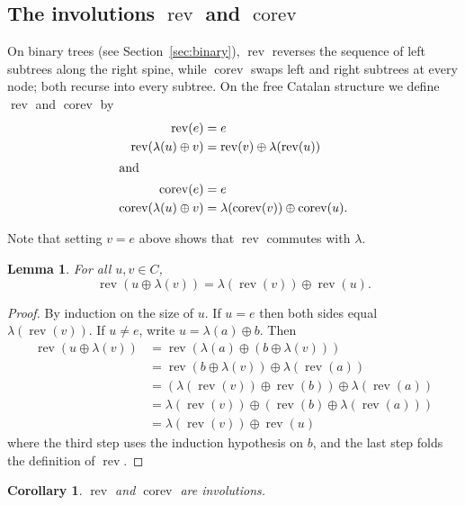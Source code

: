 \documentclass[a4paper,11pt]{article}
\newtheorem{lemma}[theorem]{Lemma}
\newtheorem{corollary}[theorem]{Corollary}
\theoremstyle{definition}
\DeclareMathOperator{\rev}{rev}
\DeclareMathOperator{\corev}{corev}
\begin{document}
\subsection{The involutions $\rev$ and
  $\corev$}\label{sec:rev-corev}

On binary trees (see Section~\ref{sec:binary}), $\rev$ reverses
the sequence of left subtrees along the right spine,
while $\corev$ swaps left and right subtrees at every
node; both recurse into every subtree.
On the free Catalan structure we define $\rev$ and
$\corev$ by
\begin{align*}
  \rev(e) &= e \\
  \rev(\lambda(u) \oplus v) &= \rev(v) \oplus \lambda(\rev(u)) \\
\shortintertext{and}
  \corev(e) &= e \\
  \corev(\lambda(u) \oplus v) &= \lambda(\corev(v)) \oplus \corev(u).
\end{align*}

Note that setting $v=e$ above shows that $\rev$ commutes with $\lambda$.

\begin{lemma}\label{lem:rev-switch}
For all $u, v \in C$,
\[
  \rev(u \oplus \lambda(v))
    = \lambda(\rev(v)) \oplus \rev(u).
\]
\end{lemma}

\begin{proof}
By induction on the size of $u$.
If $u = e$ then both sides equal $\lambda(\rev(v))$.
If $u \neq e$, write $u = \lambda(a) \oplus b$. Then
\begin{align*}
  \rev(u \oplus \lambda(v))
    &= \rev(\lambda(a)
       \oplus (b \oplus \lambda(v))) \\
    &= \rev(b \oplus \lambda(v))
       \oplus \lambda(\rev(a)) \\
    &= (\lambda(\rev(v)) \oplus \rev(b))
       \oplus \lambda(\rev(a)) \\
    &= \lambda(\rev(v))
       \oplus (\rev(b)
       \oplus \lambda(\rev(a))) \\
    &= \lambda(\rev(v))
       \oplus \rev(u)
\end{align*}
where the third step uses the induction hypothesis on
$b$, and the last step folds the definition of $\rev$.
\end{proof}

\begin{corollary}
$\rev$ and $\corev$ are involutions.
\end{corollary}
\end{document}

